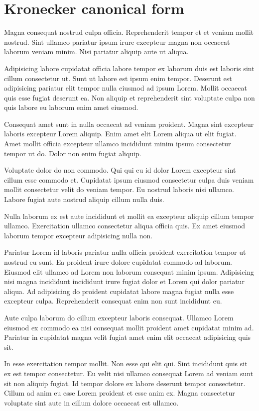 \section{Kronecker canonical form}
Magna consequat nostrud culpa officia. Reprehenderit tempor et et veniam mollit nostrud. Sint ullamco pariatur ipsum irure excepteur magna non occaecat laborum veniam minim. Nisi pariatur aliquip aute ut aliqua.

Adipisicing labore cupidatat officia labore tempor ex laborum duis est laboris sint cillum consectetur ut. Sunt ut labore est ipsum enim tempor. Deserunt est adipisicing pariatur elit tempor nulla eiusmod ad ipsum Lorem. Mollit occaecat quis esse fugiat deserunt ea. Non aliquip et reprehenderit sint voluptate culpa non quis labore eu laborum enim amet eiusmod.

Consequat amet sunt in nulla occaecat ad veniam proident. Magna sint excepteur laboris excepteur Lorem aliquip. Enim amet elit Lorem aliqua ut elit fugiat. Amet mollit officia excepteur ullamco incididunt minim ipsum consectetur tempor ut do. Dolor non enim fugiat aliquip.

Voluptate dolor do non commodo. Qui qui eu id dolor Lorem excepteur sint cillum esse commodo et. Cupidatat ipsum eiusmod consectetur culpa duis veniam mollit consectetur velit do veniam tempor. Eu nostrud laboris nisi ullamco. Labore fugiat aute nostrud aliquip cillum nulla duis.

Nulla laborum ex est aute incididunt et mollit ea excepteur aliquip cillum tempor ullamco. Exercitation ullamco consectetur aliqua officia quis. Ex amet eiusmod laborum tempor excepteur adipisicing nulla non.

Pariatur Lorem id laboris pariatur nulla officia proident exercitation tempor ut nostrud eu sunt. Ea proident irure dolore cupidatat commodo ad laborum. Eiusmod elit ullamco ad Lorem non laborum consequat minim ipsum. Adipisicing nisi magna incididunt incididunt irure fugiat dolor et Lorem qui dolor pariatur aliqua. Ad adipisicing do proident cupidatat labore magna fugiat nulla esse excepteur culpa. Reprehenderit consequat enim non sunt incididunt eu.

Aute culpa laborum do cillum excepteur laboris consequat. Ullamco Lorem eiusmod ex commodo ea nisi consequat mollit proident amet cupidatat minim ad. Pariatur in cupidatat magna velit fugiat amet enim elit occaecat adipisicing quis sit.

In esse exercitation tempor mollit. Non esse qui elit qui. Sint incididunt quis sit ex est tempor consectetur. Eu velit nisi ullamco consequat Lorem ad veniam sunt sit non aliquip fugiat. Id tempor dolore ex labore deserunt tempor consectetur. Cillum ad anim eu esse Lorem proident et esse anim ex. Magna consectetur voluptate sint aute in cillum dolore occaecat est ullamco.

